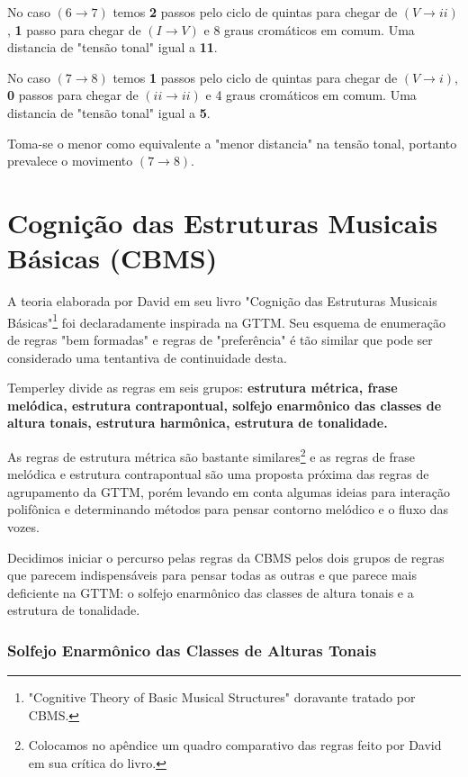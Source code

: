 \documentclass[
	12pt,				%
	openright,			%
	twoside,			%
	a4paper,			%
	english,			%
	french,				%
	spanish,			%
	brazil				%
	]{abntex2}
\begin{document}
No caso $(6 \to 7)$ temos \textbf{2} passos pelo ciclo de quintas para chegar de $(V \to ii)$, \textbf{1} passo para chegar de $(I \to V)$ e 8 graus cromáticos em comum. Uma distancia de "tensão tonal" igual a \textbf{11}.\pagebreak

No caso $(7 \to 8)$ temos \textbf{1} passos pelo ciclo de quintas para chegar de $(V \to i)$, \textbf{0} passos para chegar de $(ii \to ii)$ e 4 graus cromáticos em comum. Uma distancia de "tensão tonal" igual a \textbf{5}.

Toma-se o menor como equivalente a "menor distancia" na tensão tonal, portanto prevalece o movimento $(7 \to 8)$. 



\section{Cognição das Estruturas Musicais Básicas (CBMS)}

A teoria elaborada por David  em seu livro "Cognição das Estruturas Musicais Básicas"\footnote{"Cognitive Theory of Basic Musical Structures" doravante tratado por CBMS. } foi declaradamente inspirada na GTTM. Seu esquema de enumeração de regras "bem formadas" e regras de "preferência" é tão similar que pode ser considerado uma tentantiva de continuidade desta.

Temperley divide as regras em seis grupos: \textbf{estrutura métrica, frase melódica, estrutura contrapontual, solfejo enarmônico das classes de altura tonais, estrutura harmônica, estrutura de tonalidade.}

As regras de estrutura métrica são bastante similares\footnote{Colocamos no apêndice um quadro comparativo das regras feito por David  em sua crítica do livro.  } e as regras de frase melódica e estrutura contrapontual são uma proposta próxima das regras de agrupamento da GTTM, porém levando em conta algumas ideias para interação polifônica e determinando métodos para pensar contorno melódico e o fluxo das vozes. 

Decidimos iniciar o percurso pelas regras da CBMS pelos dois grupos de regras que parecem indispensáveis para pensar todas as outras e que parece mais deficiente na GTTM: o solfejo enarmônico das classes de altura tonais e a estrutura de tonalidade. 


\subsubsection{Solfejo Enarmônico das Classes de Alturas Tonais}
\end{document}
